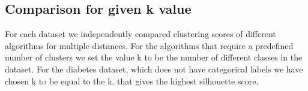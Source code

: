 \subsection{Comparison for given k value}
\marginnote{\textcolor{blue}{Jonas Elpelt}}
For each dataset we independently compared clustering scores of different algorithms for multiple distances. For the algorithms that require a predefined number of clusters we set the value k to be the number of different classes in the dataset. For the diabetes dataset, which does not have categorical labels we have chosen k to be equal to the k, that gives the highest silhouette score. \\

\begin{figure}[H]
	\centering
	\qquad
	\qquad
	\qquad

\end{figure}
